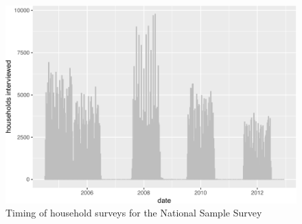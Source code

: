 \documentclass[
]{article}
\begin{document}
\FloatBarrier
\newpage
\begin{figure}
\includegraphics{draft_files/figure-latex/laborplot-1} \caption[Timing of household surveys for the National Sample Survey]{Timing of household surveys for the National Sample Survey}\label{fig:laborplot}
\end{figure}
\end{document}
